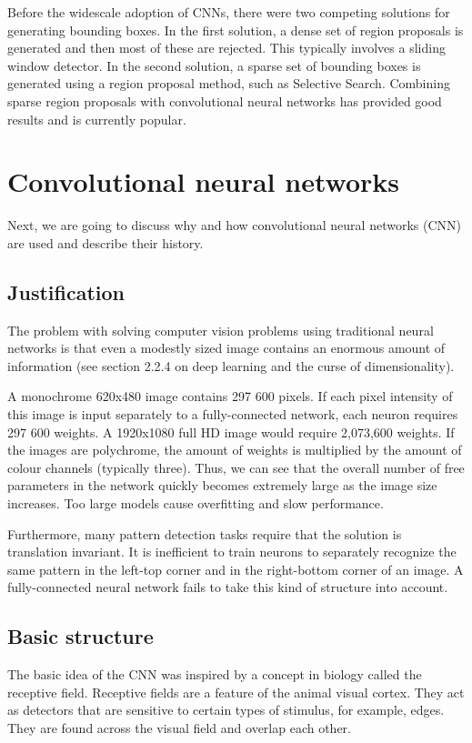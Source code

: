 Before the widescale adoption of CNNs, there were two competing solutions for generating bounding boxes. In the first solution, a dense set of region proposals is generated and then most of these are rejected. This typically involves a sliding window detector. In the second solution, a sparse set of bounding boxes is generated using a region proposal method, such as Selective Search. Combining sparse region proposals with convolutional neural networks has provided good results and is currently popular.

\section{Convolutional neural networks}
Next, we are going to discuss why and how convolutional neural networks (CNN) are used and describe their history.

\subsection{Justification}
The problem with solving computer vision problems using traditional neural networks is that even a modestly sized image contains an enormous amount of information (see section 2.2.4 on deep learning and the curse of dimensionality).

A monochrome 620x480 image contains 297 600 pixels. If each pixel intensity of this image is input separately to a fully-connected network, each neuron requires 297 600 weights. A 1920x1080 full HD image would require 2,073,600 weights. If the images are polychrome, the amount of weights is multiplied by the amount of colour channels (typically three). Thus, we can see that the overall number of free parameters in the network quickly becomes extremely large as the image size increases. Too large models cause overfitting and slow performance.

Furthermore, many pattern detection tasks require that the solution is translation invariant. It is inefficient to train neurons to separately recognize the same pattern in the left-top corner and in the right-bottom corner of an image. A fully-connected neural network fails to take this kind of structure into account. 

\subsection{Basic structure}
The basic idea of the CNN was inspired by a concept in biology called the receptive field. Receptive fields are a feature of the animal visual cortex. They act as detectors that are sensitive to certain types of stimulus, for example, edges. They are found across the visual field and overlap each other.

